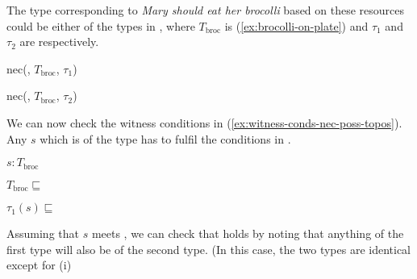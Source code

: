 The type corresponding to \textit{Mary should eat her brocolli} based
on these resources could be either of the types in \nexteg{}, where
$T_{\mathrm{broc}}$ is (\ref{ex:brocolli-on-plate}) and $\tau_1$ and
  $\tau_2$ are  respectively.
\begin{ex} 
\begin{subex} 
 
\item nec(, 
  $T_{\mathrm{broc}}$, $\tau_1$)
 
\item nec(, 
  $T_{\mathrm{broc}}$, $\tau_2$) 
 
\end{subex} 
\label{ex:Mary-should-eat-her-brocolli-types}   
\end{ex} 
We can now check the witness conditions in
(\ref{ex:witness-conds-nec-poss-topos}).  Any $s$ which is of the type
 has to fulfil the conditions in \nexteg{}.
\begin{ex} 
\begin{subex} 
 
\item $s:T_{\mathrm{broc}}$ 
 
\item $T_{\mathrm{broc}}\sqsubseteq$ 

\item  $\tau_1(s)\sqsubseteq$  
 
\end{subex} 
\label{ex:Mary-eat-her-brocolli-conditions}   
\end{ex} 
Assuming that $s$ meets , we can check that  holds
by noting that anything of the first type will also be of the second
type.  (In this case, the two types are identical except for (i)
